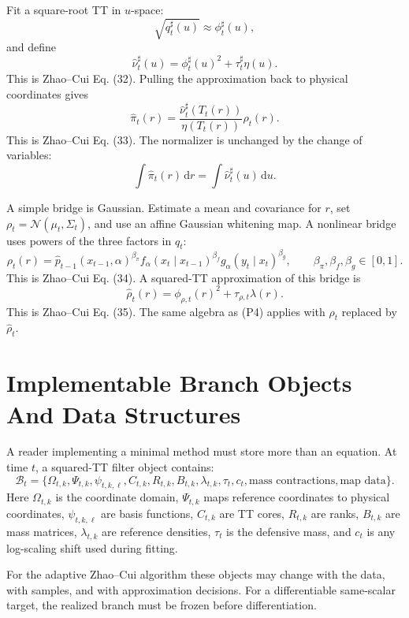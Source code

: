 \documentclass[11pt]{article}
\newcommand{\dd}{\,\mathrm d}
\begin{document}
Fit a square-root TT in \(u\)-space:
\[
    \sqrt{q^\sharp_t(u)}\approx \phi^\sharp_t(u),
\]
and define
\[
    \widehat\nu^\sharp_t(u)
    =
    \phi^\sharp_t(u)^2+\tau^\sharp_t\eta(u).
    \tag{P3}
\]
This is Zhao--Cui Eq. (32).  Pulling the approximation back to physical
coordinates gives
\[
    \widehat\pi_t(r)
    =
    \frac{\widehat\nu^\sharp_t(T_t(r))}
    {\eta(T_t(r))}
    \rho_t(r).
    \tag{P4}
\]
This is Zhao--Cui Eq. (33).  The normalizer is unchanged by the change of
variables:
\[
    \int \widehat\pi_t(r)\dd r
    =
    \int \widehat\nu^\sharp_t(u)\dd u.
    \tag{P5}
\]

A simple bridge is Gaussian.  Estimate a mean and covariance for \(r\), set
\(\rho_t=\mathcal N(\mu_t,\Sigma_t)\), and use an affine Gaussian whitening map.
A nonlinear bridge uses powers of the three factors in \(q_t\):
\[
    \rho_t(r)
    =
    \widehat p_{t-1}(x_{t-1},\alpha)^{\beta_\pi}
    f_\alpha(x_t\mid x_{t-1})^{\beta_f}
    g_\alpha(y_t\mid x_t)^{\beta_g},
    \qquad
    \beta_\pi,\beta_f,\beta_g\in[0,1].
    \tag{P6}
\]
This is Zhao--Cui Eq. (34).  A squared-TT approximation of this bridge is
\[
    \widehat\rho_t(r)
    =
    \phi_{\rho,t}(r)^2+\tau_{\rho,t}\lambda(r).
    \tag{P7}
\]
This is Zhao--Cui Eq. (35).  The same algebra as (P4) applies with
\(\rho_t\) replaced by \(\widehat\rho_t\).

\section{Implementable Branch Objects And Data Structures}

A reader implementing a minimal method must store more than an equation.  At
time \(t\), a squared-TT filter object contains:
\[
    \mathcal B_t
    =
    \{
    \Omega_{t,k},\Psi_{t,k},\psi_{t,k,\ell},C_{t,k},
    R_{t,k},B_{t,k},\lambda_{t,k},\tau_t,c_t,
    \text{mass contractions},\text{map data}
    \}.
\]
Here \(\Omega_{t,k}\) is the coordinate domain, \(\Psi_{t,k}\) maps reference
coordinates to physical coordinates, \(\psi_{t,k,\ell}\) are basis functions,
\(C_{t,k}\) are TT cores, \(R_{t,k}\) are ranks, \(B_{t,k}\) are mass matrices,
\(\lambda_{t,k}\) are reference densities, \(\tau_t\) is the defensive mass, and
\(c_t\) is any log-scaling shift used during fitting.

For the adaptive Zhao--Cui algorithm these objects may change with the data,
with samples, and with approximation decisions.  For a differentiable
same-scalar target, the realized branch must be frozen before differentiation.
\end{document}
